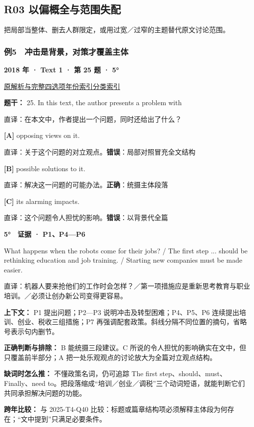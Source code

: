 \documentclass[11pt,a4paper]{article}
\begin{document}
\subsection{R03 以偏概全与范围失配}
把局部当整体、删去人群限定，或用过宽／过窄的主题替代原文讨论范围。

\subsubsection{例5　冲击是背景，对策才覆盖主体}\label{case-2018-T1-Q25}
\noindent\textbf{2018 年 · Text 1 · 第 25 题 · 5°}\par\noindent \href{https://zj139.github.io/math-notes/english/d6ce3eaae72046cee9e0b423/\#q25}{原解析与完整四选项}\quad \hyperref[idx-2018-T1-Q25]{年份索引}\quad \hyperref[class-R03]{分类索引}\par\smallskip
\noindent\textbf{题干：} 25. In this text, the author presents a problem with\par\smallskip
直译：在本文中，作者提出一个问题，同时还给出了什么？

\noindent\textbf{[A]} opposing views on it.\par\nopagebreak
\noindent 直译：关于这个问题的对立观点。\quad\textbf{错误}：局部对照冒充全文结构\par\smallskip
{}\noindent\textbf{[B]} possible solutions to it.\par\nopagebreak
\noindent 直译：解决这一问题的可能办法。\quad\textbf{正确}：统摄主体段落\par\smallskip
{}\noindent\textbf{[C]} its alarming impacts.\par\nopagebreak
\noindent 直译：这个问题令人担忧的影响。\quad\textbf{错误}：以背景代全篇\par\smallskip
\begin{evidence}\textbf{5°　证据 · P1、P4—P6}\par What happens when the robots come for their jobs? / The first step ... should be rethinking education and job training. / Starting new companies must be made easier.\par 直译：机器人要来抢他们的工作时会怎样？／第一项措施应是重新思考教育与职业培训。／必须让创办新公司变得更容易。\end{evidence}
\noindent\textbf{上下文：} P1 提出问题；P2—P3 说明冲击及转型困难；P4、P5、P6 连续提出培训、创业、税收三组措施；P7 再强调配套政策。斜线分隔不同位置的摘句，省略号表示句内删节。\par\smallskip
\noindent\textbf{正确判断与排除：} B 能统摄三段建议。C 所说的令人担忧的影响确实在文中，但只覆盖前半部分；A 把一处乐观观点的讨论放大为全篇对立观点结构。\par\smallskip
\noindent\textbf{缺词时怎么推：} 不懂政策名词，仍可追踪 The first step、should、must、Finally、need to。把段落缩成“培训／创业／调税”三个动词短语，就能判断它们共同承担解决问题的功能。\par\smallskip
\noindent\textbf{跨年比较：} 与 2025-T4-Q40 比较：标题或篇章结构项必须解释主体段为何存在；“文中提到”只满足必要条件。\par\smallskip
\clearpage
\end{document}
